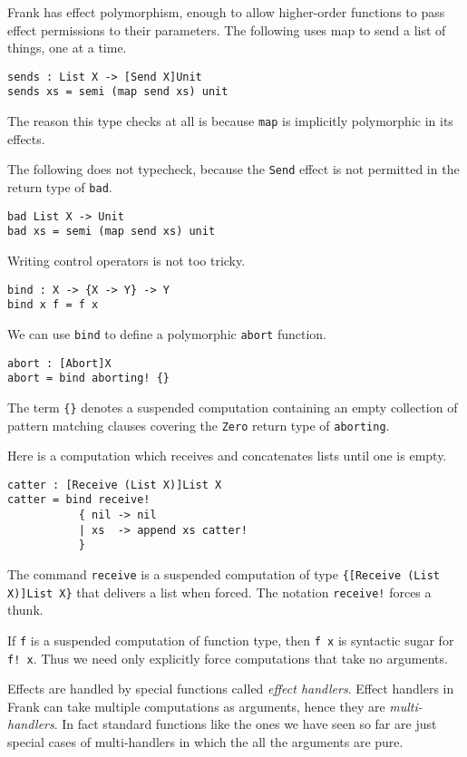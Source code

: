 \documentclass[preprint]{sigplanconf}
\begin{document}
Frank has effect polymorphism, enough to allow higher-order functions
to pass effect permissions to their parameters. The following uses map
to send a list of things, one at a time.
%
\begin{verbatim}
sends : List X -> [Send X]Unit
sends xs = semi (map send xs) unit
\end{verbatim}
%
The reason this type checks at all is because \verb!map! is implicitly
polymorphic in its effects.

The following does not typecheck, because the \verb!Send! effect is
not permitted in the return type of \verb!bad!.

\begin{verbatim}
bad List X -> Unit
bad xs = semi (map send xs) unit
\end{verbatim}

Writing control operators is not too tricky.
\begin{verbatim}
bind : X -> {X -> Y} -> Y
bind x f = f x
\end{verbatim}

We can use \verb!bind! to define a polymorphic \verb!abort! function.
\begin{verbatim}
abort : [Abort]X
abort = bind aborting! {}
\end{verbatim}
The term \verb!{}! denotes a suspended computation containing an empty
collection of pattern matching clauses covering the \verb!Zero! return
type of \verb!aborting!.

Here is a computation which receives and concatenates lists until one
is empty.
%
\begin{verbatim}
catter : [Receive (List X)]List X
catter = bind receive!
           { nil -> nil
           | xs  -> append xs catter!
           }
\end{verbatim}
%
The command \verb!receive! is a suspended computation of type
\verb!{[Receive (List X)]List X}! that delivers a list when
forced. The notation \verb|receive!| forces a thunk.

If \verb!f! is a suspended computation of function type, then
\verb!f x! is syntactic sugar for \verb|f! x|. Thus we need only
explicitly force computations that take no arguments.

Effects are handled by special functions called \emph{effect
  handlers}. Effect handlers in Frank can take multiple computations
as arguments, hence they are \emph{multi-handlers}. In fact standard
functions like the ones we have seen so far are just special cases of
multi-handlers in which the all the arguments are pure.
\end{document}
